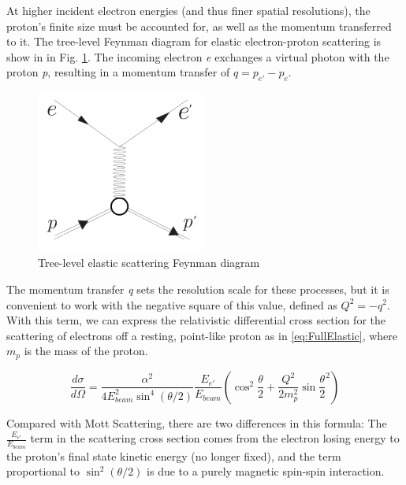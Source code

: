     
 
         At higher incident electron energies (and thus finer spatial resolutions), the proton's finite size must be accounted for, as well as the momentum transferred to it. The tree-level Feynman diagram for elastic electron-proton scattering is show in in Fig. \ref{fig:feynmanElastic}. The incoming electron \textit{e} exchanges a virtual photon with the proton \textit{p}, resulting in a momentum transfer of $q = p_{e'} - p_{e}$. 
         
        \begin{figure}[H]
            \centering
            \includegraphics[width=0.5\textwidth]{Chapters/Ch1-Intro/Ch1-Sec1-Background/pics/elastic_feynamn.png}
            \caption{Tree-level elastic scattering Feynman diagram}
            \label{fig:feynmanElastic}
        \end{figure}

        The momentum transfer \textit{q} sets the resolution scale for these processes, but it is convenient to work with the negative square of this value, defined as $Q^2 = -q^2$. With this term, we can express the relativistic differential cross section for the scattering of electrons off a resting, point-like proton as in \eqref{eq:FullElastic}, where $m_p$ is the mass of the proton. 

            \begin{equation}\label{eq:FullElastic}
                    \frac{d\sigma}{d\Omega} = \frac{\alpha^2}{4E_{beam}^2\sin^4{(\theta/2)}} \frac{E_{e'}}{E_{beam}} ( \cos^2{\frac{\theta}{2}} + \frac{Q^2}{2m_p^2}\sin{\frac{\theta}{2}}^2 )
            \end{equation}


            Compared with Mott Scattering, there are two differences in this formula: The $\frac{E_{e'}}{E_{beam}}$ term in the scattering cross section comes from the electron losing energy to the proton's final state kinetic energy (no longer fixed), and the term proportional to $\sin^2(\theta/2)$ is due to a purely magnetic spin-spin interaction. 


